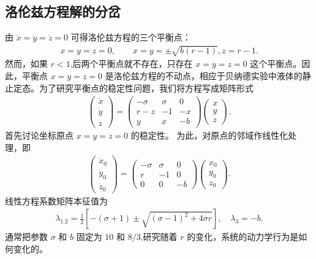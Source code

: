 \subsection{洛伦兹方程解的分岔}

由 $\dot{x}=\dot{y}=\dot{z}=0$ 可得洛伦兹方程的三个平衡点：
\begin{align}
x=y=z=0,\qquad x=y=\pm\sqrt{b(r-1)}, z=r-1.
\end{align}
然而，如果 $r<1$,后两个平衡点就不存在，只存在 $x=y=z=0$ 这个平衡点。因此，平衡点 $x=y=z=0$ 是洛伦兹方程的不动点，相应于贝纳德实验中液体的静止定态。为了研究平衡点的稳定性问题，我们将方程写成矩阵形式
\begin{align}
\left(\begin{array}{l}
\dot{x} \\
\dot{y} \\
\dot{z}
\end{array}\right)=\left(\begin{array}{ccc}
-\sigma & \sigma & 0 \\
r-z & -1 & -x \\
y & x & -b
\end{array}\right)\left(\begin{array}{l}
x \\
y \\
z
\end{array}\right) .
\end{align}
首先讨论坐标原点 $x=y=z=0$ 的稳定性。 为此，对原点的邻域作线性化处理，即
\begin{align}
\left(\begin{array}{l}
\dot{x}_{0} \\
\dot{y}_{0} \\
\dot{z}_{0}
\end{array}\right)=\left(\begin{array}{ccc}
-\sigma & \sigma & 0 \\
r & -1 & 0 \\
0 & 0 & -b
\end{array}\right)\left(\begin{array}{l}
x_{0} \\
y_{0} \\
z_{0}
\end{array}\right).
\end{align}
线性方程系数矩阵本征值为
\begin{align}
\lambda_{1.2}=\frac{1}{2}\left[-(\sigma+1) \pm \sqrt{(\sigma-1)^{2}+4 \sigma r}\right], \quad \lambda_{3}=-b.
\end{align}
通常把参数 $\sigma$ 和 $b$ 固定为 $10$ 和 $8/3$,研究随着 $r$ 的变化，系统的动力学行为是如何变化的。

